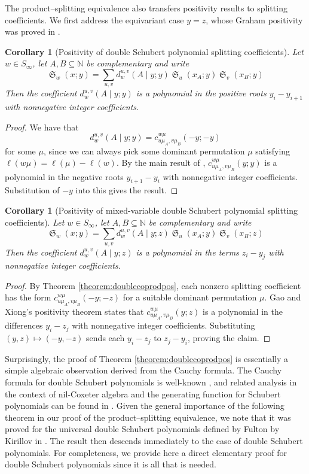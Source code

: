 \documentclass[reqno]{amsart}
\newtheorem{corollary}[lemma]{Corollary}
\theoremstyle{definition}
\theoremstyle{remark}
\numberwithin{equation}{subsection}
\DeclareMathOperator{\sch}{\mathfrak{S}}
\newcommand{\cpcf}[5]{d^{#1,#2}_{#3}\left(#4\mid #5\right)}
\begin{document}
The product--splitting equivalence also transfers positivity results to splitting coefficients. We first address the equivariant case $y=z$, whose Graham positivity was proved in \cite{anderson2023strong}.

\begin{corollary}[Positivity of double Schubert polynomial splitting coefficients]
Let $w\in S_\infty$, let $A,B\subseteq \mathbb{N}$ be complementary and write
$$\sch_w(x;y)=\sum_{u,v}\cpcf{u}{v}{w}{A}{y;y}\sch_u(x_A;y)\sch_v(x_B;y)$$
Then the coefficient $\cpcf{u}{v}{w}{A}{y;y}$ is a polynomial in the positive roots $y_i-y_{i+1}$ with nonnegative integer coefficients.
\end{corollary}
\begin{proof}
We have that
$$\cpcf{u}{v}{w}{A}{y;y}=c_{u\mu_A,v\mu_B}^{w\mu}(-y;-y)$$
for some $\mu$, since we can always pick some dominant permutation $\mu$ satisfying $\ell(w\mu)=\ell(\mu)-\ell(w)$. By the main result of \cite{graham2001positivity}, $c_{u\mu_A,v\mu_B}^{w\mu}(y;y)$ is a polynomial in the negative roots $y_{i+1}-y_i$ with nonnegative integer coefficients. Substitution of $-y$ into this gives the result.
\end{proof}

\begin{corollary}[Positivity of mixed-variable double Schubert polynomial splitting coefficients]
	Let $w\in S_\infty$, let $A,B\subseteq \mathbb{N}$ be complementary and write
	$$\sch_w(x;y)=\sum_{u,v}\cpcf{u}{v}{w}{A}{y;z}\sch_u(x_A;y)\sch_v(x_B;z)$$
	Then the coefficient $\cpcf{u}{v}{w}{A}{y;z}$ is a polynomial in the terms $z_i-y_j$ with nonnegative integer coefficients.
\end{corollary}
\begin{proof}
	By Theorem \ref{theorem:doublecoprodpos}, each nonzero splitting coefficient has the form $c_{u\mu_A,v\mu_B}^{w\mu}(-y;-z)$ for a suitable dominant permutation $\mu$. Gao and Xiong's positivity theorem \cite[Theorem~1.1]{gao2025grahampositivitytripleschubert} states that $c_{u\mu_A,v\mu_B}^{w\mu}(y;z)$ is a polynomial in the differences $y_i-z_j$ with nonnegative integer coefficients. Substituting $(y,z)\mapsto(-y,-z)$ sends each $y_i-z_j$ to $z_j-y_i$, proving the claim.
\end{proof}


Surprisingly, the proof of Theorem \ref{theorem:doublecoprodpos} is essentially a simple algebraic observation derived from the Cauchy formula. The Cauchy formula for double Schubert polynomials is well-known \cite{notes}, and related analysis in the context of nil-Coxeter algebra and the generating function for Schubert polynomials can be found in \cite{fominstan}. Given the general importance of the following theorem in our proof of the product--splitting equivalence, we note that it was proved for the universal double Schubert polynomials defined by Fulton \cite{fulton1999universal} by Kirillov in \cite{kirillov2004cauchy}. The result then descends immediately to the case of double Schubert polynomials. For completeness, we provide here a direct elementary proof for double Schubert polynomials since it is all that is needed.
\end{document}
